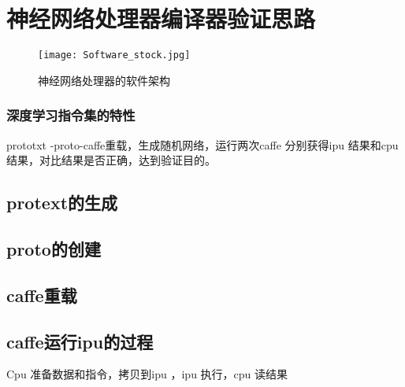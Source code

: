 \chapter{神经网络处理器编译器验证思路}

\begin{figure}[!htbp]
\centering
\texttt{[image: Software\_stock.jpg]}
\caption{神经网络处理器的软件架构}
\label{fig:Software stock}
\end{figure}
\subsection{深度学习指令集的特性}

prototxt -proto-caffe重载，生成随机网络，运行两次caffe 分别获得ipu 结果和cpu 结果，对比结果是否正确，达到验证目的。
\section{protext的生成}

\section{proto的创建}

\section{caffe重载}

\section{caffe运行ipu的过程}
Cpu 准备数据和指令，拷贝到ipu ，ipu 执行，cpu 读结果